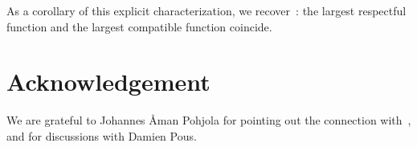 \documentclass{CSML}
\theoremstyle{definition}
\begin{document}
As a corollary of this explicit characterization, we
recover~\cite[Proposition~9.1]{Pous2016}: the largest respectful
function and the largest compatible function coincide.

\section*{Acknowledgement}

\noindent We are grateful to Johannes \AA{}man Pohjola for pointing
out the connection with~\cite{Pous2007}, and for discussions with
Damien Pous.



\end{document}
